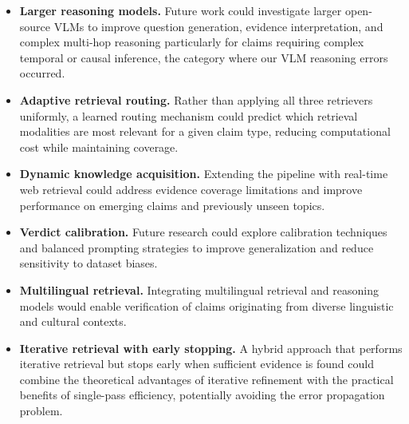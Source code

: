\begin{itemize}
    \item \textbf{Larger reasoning models.} Future work could investigate larger open-source VLMs to improve question generation, evidence interpretation, and complex multi-hop reasoning particularly for claims requiring complex temporal or causal inference, the category where our VLM reasoning errors occurred.
    
    \item \textbf{Adaptive retrieval routing.} Rather than applying all three retrievers uniformly, a learned routing mechanism could predict which retrieval modalities are most relevant for a given claim type, reducing computational cost while maintaining coverage.
    
    \item \textbf{Dynamic knowledge acquisition.} Extending the pipeline with real-time web retrieval could address evidence coverage limitations and improve performance on emerging claims and previously unseen topics.
    
    \item \textbf{Verdict calibration.} Future research could explore calibration techniques and balanced prompting strategies to improve generalization and reduce sensitivity to dataset biases.
    
    \item \textbf{Multilingual retrieval.} Integrating multilingual retrieval and reasoning models would enable verification of claims originating from diverse linguistic and cultural contexts.
    
    \item \textbf{Iterative retrieval with early stopping.} A hybrid approach that performs iterative retrieval but stops early when sufficient evidence is found could combine the theoretical advantages of iterative refinement with the practical benefits of single-pass efficiency, potentially avoiding the error propagation problem.
\end{itemize}

